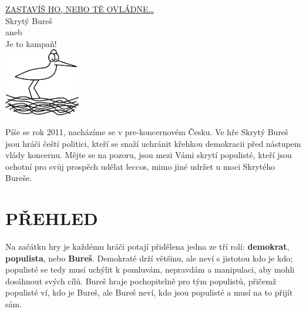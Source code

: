 \documentclass{article}
\begin{document}
\ttfamily

\thispagestyle{empty}
\begin{center}
    \selectfont
    \vspace*{2em}
    {\Large \uline{ZASTAVÍŠ HO, NEBO TĚ OVLÁDNE\ldots}\\}
    \vspace{16em}
    {\Huge Skrytý Bureš\\}
    \vspace{2em}
    {\large aneb}\\
    \vspace{1em}
    {\Large Je to kampaň!\\}
    \vspace{13em}
    \includegraphics[height=8em]{capi_hnizdo.pdf}
\end{center}

\newpage
\twocolumn
\sffamily

Píše se rok 2011, nacházíme se v pre-kon\-cer\-no\-vém Česku. Ve hře Skrytý Bureš jsou hráči čeští politici, kteří se snaží uchránit křehkou demokracii před nástupem vlády koncernu. Mějte se na pozoru, jsou mezi Vámi skrytí populisté, kteří jsou ochotní pro svůj prospěch udělat leccos, mimo jiné udržet u moci Skrytého Bureše.

%
%


\section*{PŘEHLED}

    Na začátku hry je každému hráči potají při\-dě\-le\-na jedna ze tří rolí: \textbf{demokrat}, \textbf{populista}, nebo \textbf{Bureš}.
    Demokraté drží většinu, ale neví s jistotou kdo je kdo; populisté se tedy musí uchýlit k pomluvám, nepravdám a manipulaci, aby mohli dosáhnout svých cílů. Bureš hraje pochopitelně pro tým populistů, přičemž populisté ví, kdo je Bureš, ale Bureš neví, kdo jsou populisté a musí na to přijít sám.
\end{document}
